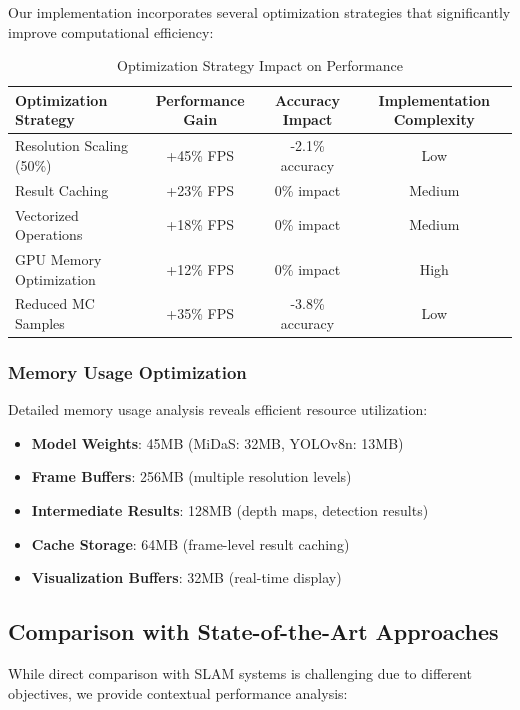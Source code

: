 \documentclass[10pt]{article}
\begin{document}
Our implementation incorporates several optimization strategies that significantly improve computational efficiency:

\begin{table}[ht]
\centering
\caption{Optimization Strategy Impact on Performance}
\label{tab:optimization_impact}
\begin{tabular}{@{}lccc@{}}
\toprule
\textbf{Optimization Strategy} & \textbf{Performance Gain} & \textbf{Accuracy Impact} & \textbf{Implementation Complexity} \\
\midrule
Resolution Scaling (50\%) & +45\% FPS & -2.1\% accuracy & Low \\
Result Caching & +23\% FPS & 0\% impact & Medium \\
Vectorized Operations & +18\% FPS & 0\% impact & Medium \\
GPU Memory Optimization & +12\% FPS & 0\% impact & High \\
Reduced MC Samples & +35\% FPS & -3.8\% accuracy & Low \\
\bottomrule
\end{tabular}
\end{table}

\subsubsection{Memory Usage Optimization}

Detailed memory usage analysis reveals efficient resource utilization:

\begin{itemize}
\item \textbf{Model Weights}: 45MB (MiDaS: 32MB, YOLOv8n: 13MB)
\item \textbf{Frame Buffers}: 256MB (multiple resolution levels)
\item \textbf{Intermediate Results}: 128MB (depth maps, detection results)
\item \textbf{Cache Storage}: 64MB (frame-level result caching)
\item \textbf{Visualization Buffers}: 32MB (real-time display)
\end{itemize}

\subsection{Comparison with State-of-the-Art Approaches}

While direct comparison with SLAM systems is challenging due to different objectives, we provide contextual performance analysis:
\end{document}
